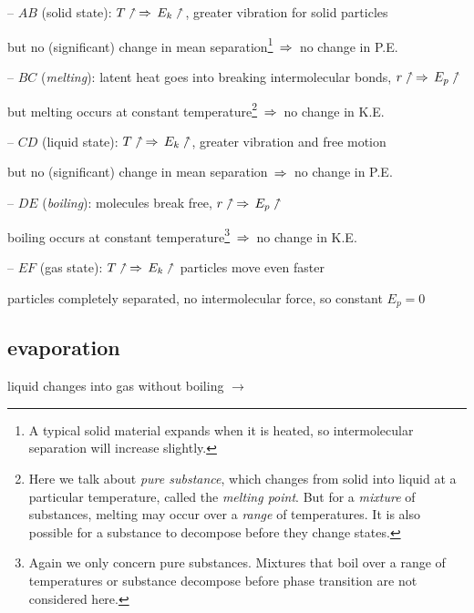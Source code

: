 \begin{compactitem}
\item[--] $AB$ (solid state): $T \nnearrow \, \Rightarrow \, E_k \nnearrow$, greater vibration for solid particles

but no (significant) change in mean separation\footnote{A typical solid material expands when it is heated, so intermolecular separation will increase slightly.} $\, \Rightarrow \,$ no change in P.E.

\item[--] $BC$ (\emph{melting}): latent heat goes into breaking intermolecular bonds, $r\nnearrow \, \Rightarrow \, E_p \nnearrow$

but melting occurs at constant temperature\footnote{Here we talk about \emph{pure substance}, which changes from solid into liquid at a particular temperature, called the \emph{melting point}. But for a \emph{mixture} of substances, melting may occur over a \emph{range} of temperatures. It is also possible for a substance to decompose before they change states.} $\, \Rightarrow \,$ no change in K.E.

\item[--] $CD$ (liquid state): $T \nnearrow \, \Rightarrow \, E_k \nnearrow$, greater vibration and free motion

but no (significant) change in mean separation $\, \Rightarrow \,$ no change in P.E.

\item[--] $DE$ (\emph{boiling}): molecules break free, $r\nnearrow \, \Rightarrow \, E_p \nnearrow$

boiling occurs at constant temperature\footnote{Again we only concern pure substances. Mixtures that boil over a range of temperatures or substance decompose before phase transition are not considered here.} $\, \Rightarrow \,$ no change in K.E.

\item[--] $EF$ (gas state): $T \nnearrow \, \Rightarrow \, E_k \nnearrow$ particles move even faster

particles completely separated, no intermolecular force, so constant $E_p = 0$
\end{compactitem}


\subsection*{evaporation}

liquid changes into gas without boiling $\longrightarrow$ 

